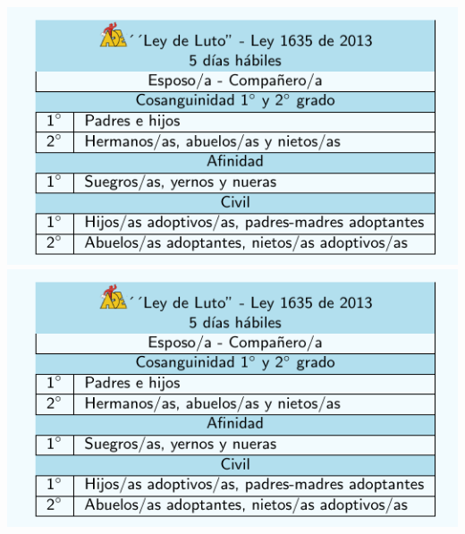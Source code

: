 \documentclass[10pt,letterpaper]{minimal}
\begin{document}
\begin{center}
\hspace{1mm}\includegraphics[scale=1]{Tarjeta2.pdf} \includegraphics[scale=1]{Tarjeta2.pdf} \vspace{1mm}


\end{center}
\end{document}
